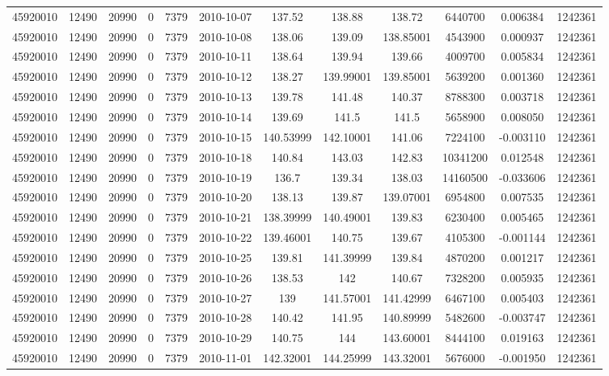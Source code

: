 \documentclass[12 pt]{article}
\begin{document}
\begin{flushleft}
\begin{table}[h]
\begin{tabular}{c c c c c c c c c c c c }
45920010 & 12490 & 20990 & 0 & 7379 & 2010-10-07 & 137.52 & 138.88 & 138.72 & 6440700 & 0.006384 & 1242361\\
45920010 & 12490 & 20990 & 0 & 7379 & 2010-10-08 & 138.06 & 139.09 & 138.85001 & 4543900 & 0.000937 & 1242361\\
45920010 & 12490 & 20990 & 0 & 7379 & 2010-10-11 & 138.64 & 139.94 & 139.66 & 4009700 & 0.005834 & 1242361\\
45920010 & 12490 & 20990 & 0 & 7379 & 2010-10-12 & 138.27 & 139.99001 & 139.85001 & 5639200 & 0.001360 & 1242361\\
45920010 & 12490 & 20990 & 0 & 7379 & 2010-10-13 & 139.78 & 141.48 & 140.37 & 8788300 & 0.003718 & 1242361\\
45920010 & 12490 & 20990 & 0 & 7379 & 2010-10-14 & 139.69 & 141.5 & 141.5 & 5658900 & 0.008050 & 1242361\\
45920010 & 12490 & 20990 & 0 & 7379 & 2010-10-15 & 140.53999 & 142.10001 & 141.06 & 7224100 & -0.003110 & 1242361\\
45920010 & 12490 & 20990 & 0 & 7379 & 2010-10-18 & 140.84 & 143.03 & 142.83 & 10341200 & 0.012548 & 1242361\\
45920010 & 12490 & 20990 & 0 & 7379 & 2010-10-19 & 136.7 & 139.34 & 138.03 & 14160500 & -0.033606 & 1242361\\
45920010 & 12490 & 20990 & 0 & 7379 & 2010-10-20 & 138.13 & 139.87 & 139.07001 & 6954800 & 0.007535 & 1242361\\
45920010 & 12490 & 20990 & 0 & 7379 & 2010-10-21 & 138.39999 & 140.49001 & 139.83 & 6230400 & 0.005465 & 1242361\\
45920010 & 12490 & 20990 & 0 & 7379 & 2010-10-22 & 139.46001 & 140.75 & 139.67 & 4105300 & -0.001144 & 1242361\\
45920010 & 12490 & 20990 & 0 & 7379 & 2010-10-25 & 139.81 & 141.39999 & 139.84 & 4870200 & 0.001217 & 1242361\\
45920010 & 12490 & 20990 & 0 & 7379 & 2010-10-26 & 138.53 & 142 & 140.67 & 7328200 & 0.005935 & 1242361\\
45920010 & 12490 & 20990 & 0 & 7379 & 2010-10-27 & 139 & 141.57001 & 141.42999 & 6467100 & 0.005403 & 1242361\\
45920010 & 12490 & 20990 & 0 & 7379 & 2010-10-28 & 140.42 & 141.95 & 140.89999 & 5482600 & -0.003747 & 1242361\\
45920010 & 12490 & 20990 & 0 & 7379 & 2010-10-29 & 140.75 & 144 & 143.60001 & 8444100 & 0.019163 & 1242361\\
45920010 & 12490 & 20990 & 0 & 7379 & 2010-11-01 & 142.32001 & 144.25999 & 143.32001 & 5676000 & -0.001950 & 1242361\\

\end{tabular}
\end{table}
\end{flushleft}
\end{document}
